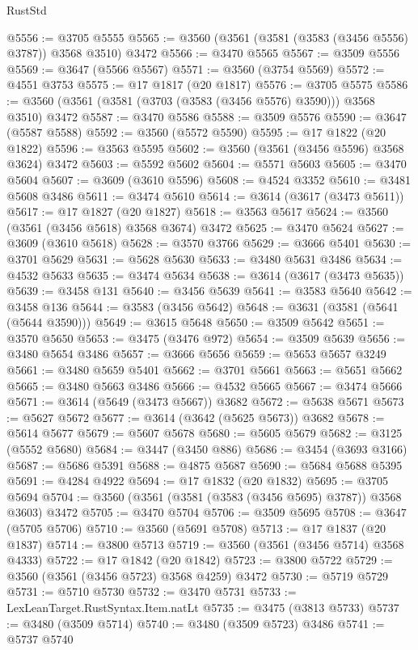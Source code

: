 \begin{lexlean}{RustStd}
\begin{coremodule}
@5556 := @3705 @5555
@5565 := @3560 (@3561 (@3581 (@3583 (@3456 @5556) @3787)) @3568 @3510) @3472
@5566 := @3470 @5565
@5567 := @3509 @5556
@5569 := @3647 (@5566 @5567)
@5571 := @3560 (@3754 @5569)
@5572 := @4551 @3753
@5575 := @17 @1817 (@20 @1817)
@5576 := @3705 @5575
@5586 := @3560 (@3561 (@3581 (@3703 (@3583 (@3456 @5576) @3590))) @3568 @3510) @3472
@5587 := @3470 @5586
@5588 := @3509 @5576
@5590 := @3647 (@5587 @5588)
@5592 := @3560 (@5572 @5590)
@5595 := @17 @1822 (@20 @1822)
@5596 := @3563 @5595
@5602 := @3560 (@3561 (@3456 @5596) @3568 @3624) @3472
@5603 := @5592 @5602
@5604 := @5571 @5603
@5605 := @3470 @5604
@5607 := @3609 (@3610 @5596)
@5608 := @4524 @3352
@5610 := @3481 @5608 @3486
@5611 := @3474 @5610
@5614 := @3614 (@3617 (@3473 @5611))
@5617 := @17 @1827 (@20 @1827)
@5618 := @3563 @5617
@5624 := @3560 (@3561 (@3456 @5618) @3568 @3674) @3472
@5625 := @3470 @5624
@5627 := @3609 (@3610 @5618)
@5628 := @3570 @3766
@5629 := @3666 @5401
@5630 := @3701 @5629
@5631 := @5628 @5630
@5633 := @3480 @5631 @3486
@5634 := @4532 @5633
@5635 := @3474 @5634
@5638 := @3614 (@3617 (@3473 @5635))
@5639 := @3458 @131
@5640 := @3456 @5639
@5641 := @3583 @5640
@5642 := @3458 @136
@5644 := @3583 (@3456 @5642)
@5648 := @3631 (@3581 (@5641 (@5644 @3590)))
@5649 := @3615 @5648
@5650 := @3509 @5642
@5651 := @3570 @5650
@5653 := @3475 (@3476 @972)
@5654 := @3509 @5639
@5656 := @3480 @5654 @3486
@5657 := @3666 @5656
@5659 := @5653 @5657 @3249
@5661 := @3480 @5659 @5401
@5662 := @3701 @5661
@5663 := @5651 @5662
@5665 := @3480 @5663 @3486
@5666 := @4532 @5665
@5667 := @3474 @5666
@5671 := @3614 (@5649 (@3473 @5667)) @3682
@5672 := @5638 @5671
@5673 := @5627 @5672
@5677 := @3614 (@3642 (@5625 @5673)) @3682
@5678 := @5614 @5677
@5679 := @5607 @5678
@5680 := @5605 @5679
@5682 := @3125 (@5552 @5680)
@5684 := @3447 (@3450 @886)
@5686 := @3454 (@3693 @3166)
@5687 := @5686 @5391
@5688 := @4875 @5687
@5690 := @5684 @5688 @5395
@5691 := @4284 @4922
@5694 := @17 @1832 (@20 @1832)
@5695 := @3705 @5694
@5704 := @3560 (@3561 (@3581 (@3583 (@3456 @5695) @3787)) @3568 @3603) @3472
@5705 := @3470 @5704
@5706 := @3509 @5695
@5708 := @3647 (@5705 @5706)
@5710 := @3560 (@5691 @5708)
@5713 := @17 @1837 (@20 @1837)
@5714 := @3800 @5713
@5719 := @3560 (@3561 (@3456 @5714) @3568 @4333)
@5722 := @17 @1842 (@20 @1842)
@5723 := @3800 @5722
@5729 := @3560 (@3561 (@3456 @5723) @3568 @4259) @3472
@5730 := @5719 @5729
@5731 := @5710 @5730
@5732 := @3470 @5731
@5733 := LexLeanTarget.RustSyntax.Item.natLt
@5735 := @3475 (@3813 @5733)
@5737 := @3480 (@3509 @5714)
@5740 := @3480 (@3509 @5723) @3486
@5741 := @5737 @5740

\end{coremodule}
\end{lexlean}
